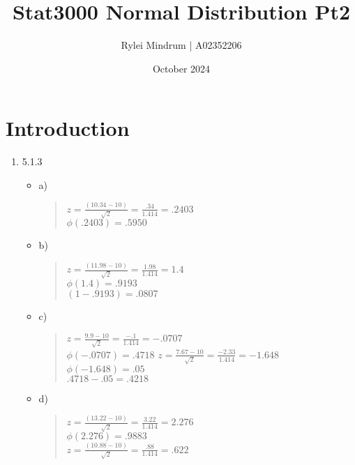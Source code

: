 \documentclass{article}
\title{Stat3000 Normal Distribution Pt2}
\author{Rylei Mindrum | A02352206}
\date{October 2024}
\begin{document}
\maketitle
\section{Introduction}
\begin{enumerate}
    \item 5.1.3 
        \begin{itemize}
            \item a)
            \begin{quote}
                $z=\frac{(10.34-10)}{\sqrt{2}} = \frac{.34}{1.414} = .2403$ \\
                $\phi(.2403) = .5950$
            \end{quote}
        \end{itemize}
        \begin{itemize}
            \item b)
            \begin{quote}
                $z = \frac{(11.98-10)}{\sqrt{2}} = \frac{1.98}{1.414} = 1.4$ \\
                $\phi(1.4) = .9193$ \\
                $(1-.9193) = .0807$
            \end{quote}
        \end{itemize}
        \begin{itemize}
            \item c)
            \begin{quote}
                $z = \frac{9.9-10}{\sqrt{2}} = \frac{-.1}{1.414} = -.0707$ \\
                $\phi(-.0707) = .4718$
                $z = \frac{7.67-10}{\sqrt{2}} = \frac{-2.33}{1.414} = -1.648$
                $\phi(-1.648) = .05$ \\
                $.4718 - .05 = .4218$
            \end{quote}
        \end{itemize}
        \begin{itemize}
            \item d)
            \begin{quote}
                $z = \frac{(13.22-10)}{\sqrt{2}} = \frac{3.22}{1.414} = 2.276$ \\
                $\phi(2.276) = .9883$ \\
                $z = \frac{(10.88-10)}{\sqrt{2}} = \frac{.88}{1.414} = .622$ \\

\end{quote}
\end{itemize}
\end{enumerate}
\end{document}
